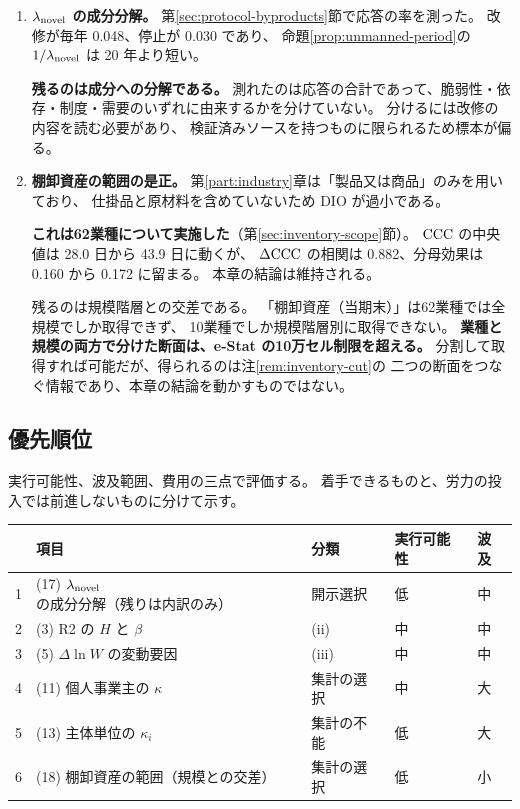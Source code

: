 \begin{enumerate}[label=(\arabic*),start=17]
\item \textbf{$\lambda_{\rm novel}$ の成分分解。}
第\ref{sec:protocol-byproducts}節で応答の率を測った。
改修が毎年 0.048、停止が 0.030 であり、
命題\ref{prop:unmanned-period}の $1/\lambda_{\rm novel}$ は 20 年より短い。

\textbf{残るのは成分への分解である。}
測れたのは応答の合計であって、脆弱性・依存・制度・需要のいずれに由来するかを分けていない。
分けるには改修の内容を読む必要があり、
検証済みソースを持つものに限られるため標本が偏る。

\item \textbf{棚卸資産の範囲の是正。}
第\ref{part:industry}章は「製品又は商品」のみを用いており、
仕掛品と原材料を含めていないため $\mathrm{DIO}$ が過小である。

\textbf{これは62業種について実施した}（第\ref{sec:inventory-scope}節）。
$\mathrm{CCC}$ の中央値は 28.0 日から 43.9 日に動くが、
$\Delta\mathrm{CCC}$ の相関は 0.882、分母効果は 0.160 から 0.172 に留まる。
本章の結論は維持される。

残るのは規模階層との交差である。
「棚卸資産（当期末）」は62業種では全規模でしか取得できず、
10業種でしか規模階層別に取得できない。
\textbf{業種と規模の両方で分けた断面は、e-Stat の10万セル制限を超える。}
分割して取得すれば可能だが、得られるのは注\ref{rem:inventory-cut}の
二つの断面をつなぐ情報であり、本章の結論を動かすものではない。

\end{enumerate}

\subsection{優先順位}

実行可能性、波及範囲、費用の三点で評価する。
着手できるものと、労力の投入では前進しないものに分けて示す。

\begin{center}
\begin{tabularx}{\textwidth}{@{}rXlll@{}}
\toprule
 & 項目 & 分類 & 実行可能性 & 波及 \\
\midrule
1 & (17) $\lambda_{\rm novel}$ の成分分解（残りは内訳のみ） & 開示選択 & 低 & 中 \\
2 & (3) R2 の $H$ と $\beta$ & (ii) & 中 & 中 \\
3 & (5) $\Delta\ln W$ の変動要因 & (iii) & 中 & 中 \\
4 & (11) 個人事業主の $\kappa$ & 集計の選択 & 中 & 大 \\
5 & (13) 主体単位の $\kappa_i$ & 集計の不能 & 低 & 大 \\
6 & (18) 棚卸資産の範囲（規模との交差） & 集計の選択 & 低 & 小 \\
\bottomrule
\end{tabularx}
\label{tab:unresolved-priority}
\end{center}

